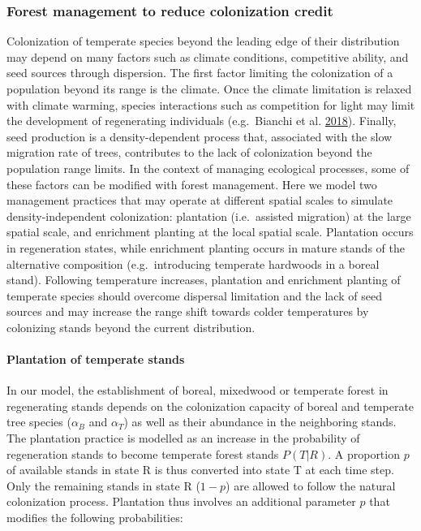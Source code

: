 \documentclass[12pt]{article}
\begin{document}
\hypertarget{forest-management-to-reduce-colonization-credit}{%
\subsubsection{Forest management to reduce colonization
credit}\label{forest-management-to-reduce-colonization-credit}}

Colonization of temperate species beyond the leading edge of their
distribution may depend on many factors such as climate conditions,
competitive ability, and seed sources through dispersion. The first
factor limiting the colonization of a population beyond its range is the
climate. Once the climate limitation is relaxed with climate warming,
species interactions such as competition for light may limit the
development of regenerating individuals (e.g.~Bianchi et al.
\protect\hyperlink{ref-Bianchi2018}{2018}). Finally, seed production is
a density-dependent process that, associated with the slow migration
rate of trees, contributes to the lack of colonization beyond the
population range limits. In the context of managing ecological
processes, some of these factors can be modified with forest management.
Here we model two management practices that may operate at different
spatial scales to simulate density-independent colonization: plantation
(i.e.~assisted migration) at the large spatial scale, and enrichment
planting at the local spatial scale. Plantation occurs in regeneration
states, while enrichment planting occurs in mature stands of the
alternative composition (e.g.~introducing temperate hardwoods in a
boreal stand). Following temperature increases, plantation and
enrichment planting of temperate species should overcome dispersal
limitation and the lack of seed sources and may increase the range shift
towards colder temperatures by colonizing stands beyond the current
distribution.

\hypertarget{plantation-of-temperate-stands}{%
\paragraph{Plantation of temperate
stands}\label{plantation-of-temperate-stands}}

In our model, the establishment of boreal, mixedwood or temperate forest
in regenerating stands depends on the colonization capacity of boreal
and temperate tree species (\(\alpha_B\) and \(\alpha_T\)) as well as
their abundance in the neighboring stands. The plantation practice is
modelled as an increase in the probability of regeneration stands to
become temperate forest stands \(P(T|R)\). A proportion \(p\) of
available stands in state R is thus converted into state T at each time
step. Only the remaining stands in state R (\(1-p\)) are allowed to
follow the natural colonization process. Plantation thus involves an
additional parameter \(p\) that modifies the following probabilities:
\end{document}
